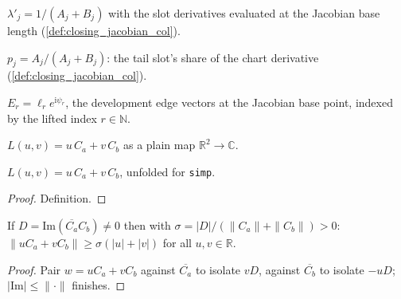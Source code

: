 \begin{definition}
  \label{def:jacobian_lambda}
  $\lambda'_j = 1/(A_j + B_j)$ with the slot derivatives evaluated at the
  Jacobian base length (\cref{def:closing_jacobian_col}).
\end{definition}

\begin{definition}
  \label{def:jacobian_share}
  $p_j = A_j/(A_j + B_j)$: the tail slot's share of the chart derivative
  (\cref{def:closing_jacobian_col}).
\end{definition}

\begin{definition}
  \label{def:jacobian_edge}
  $E_r = \ell_r e^{\mathrm{i}\psi_r}$, the development edge vectors at the
  Jacobian base point, indexed by the lifted index $r \in \mathbb{N}$.
\end{definition}

\begin{definition}
  \label{def:closing_jacobian_l}
  $L(u,v) = u\,C_a + v\,C_b$ as a plain map $\mathbb{R}^2 \to \mathbb{C}$.
\end{definition}

\begin{lemma}\leanok
[evaluation of $L$]
  \label{lem:closing_jacobian_l_apply}
  $L(u,v) = u\,C_a + v\,C_b$, unfolded for \texttt{simp}.
\end{lemma}
\begin{proof}

\leanok
  Definition.
\end{proof}

\begin{lemma}
  \label{lem:norm_smul_add_smul_ge}
  If $D = \mathrm{Im}(\overline{C_a}C_b) \ne 0$ then with
  $\sigma = |D|/(\|C_a\| + \|C_b\|) > 0$:
  $\|u C_a + v C_b\| \ge \sigma(|u| + |v|)$ for all $u, v \in \mathbb{R}$.
\end{lemma}
\begin{proof}

\leanok
  Pair $w = uC_a + vC_b$ against $\overline{C_a}$ to isolate $vD$, against
  $\overline{C_b}$ to isolate $-uD$; $|\mathrm{Im}| \le \|\cdot\|$ finishes.
\end{proof}

